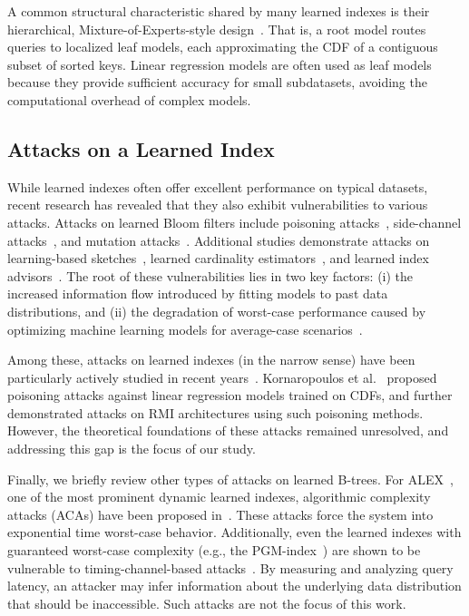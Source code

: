 \documentclass[acmsmall]{acmart}
\begin{document}
A common structural characteristic shared by many learned indexes is their hierarchical, Mixture-of-Experts-style design~\cite{sun2023learned}.
That is, a root model routes queries to localized leaf models, each approximating the CDF of a contiguous subset of sorted keys.
Linear regression models are often used as leaf models~\cite{ding2020alex,li2021finedex,wang2020sindex,sun2023learned} because they provide sufficient accuracy for small subdatasets, avoiding the computational overhead of complex models.


\subsection{Attacks on a Learned Index}
\label{sec:related_work_attacks_on_learned_index}

While learned indexes often offer excellent performance on typical datasets, recent research has revealed that they also exhibit vulnerabilities to various attacks.
Attacks on learned Bloom filters include poisoning attacks~\cite{dong2025poisoning}, side-channel attacks~\cite{farwah2024exploiting}, and mutation attacks~\cite{reviriego2021learned}.
Additional studies demonstrate attacks on learning-based sketches~\cite{jing2022deceiving}, learned cardinality estimators~\cite{zhang2024pace}, and learned index advisors~\cite{zhou2024trap,zheng2024robustness}.
The root of these vulnerabilities lies in two key factors: (i) the increased information flow introduced by fitting models to past data distributions, and (ii) the degradation of worst-case performance caused by optimizing machine learning models for average-case scenarios~\cite{schuster2025learned}.

Among these, attacks on learned indexes (in the narrow sense) have been particularly actively studied in recent years~\citep{kornaropoulos2022price,yang2023algorithmic,schuster2025learned}.
Kornaropoulos et al.~\cite{kornaropoulos2022price} proposed poisoning attacks against linear regression models trained on CDFs, and further demonstrated attacks on RMI architectures using such poisoning methods.
However, the theoretical foundations of these attacks remained unresolved, and addressing this gap is the focus of our study.

Finally, we briefly review other types of attacks on learned B-trees.
For ALEX~\cite{ding2020alex}, one of the most prominent dynamic learned indexes, algorithmic complexity attacks (ACAs) have been proposed in~\cite{yang2023algorithmic,schuster2025learned}.
These attacks force the system into exponential time worst-case behavior.
Additionally, even the learned indexes with guaranteed worst-case complexity (e.g., the PGM-index~\cite{ferragina2020pgm}) are shown to be vulnerable to timing-channel-based attacks~\cite{schuster2025learned}.
By measuring and analyzing query latency, an attacker may infer information about the underlying data distribution that should be inaccessible. Such attacks are not the focus of this work.
\end{document}
